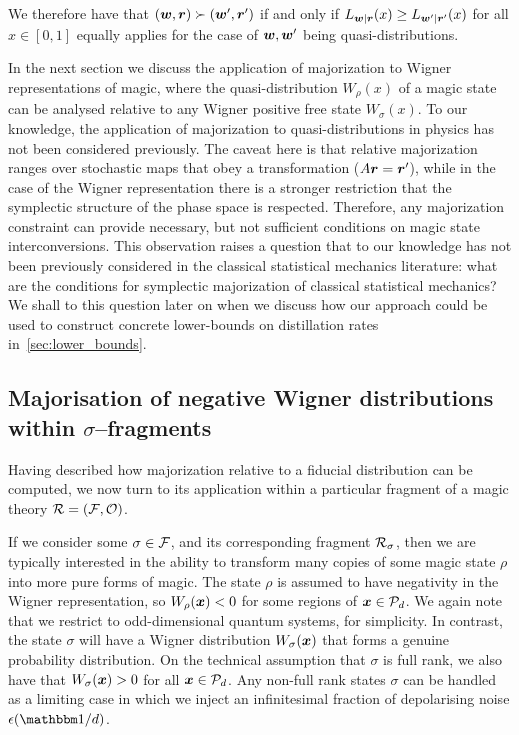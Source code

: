 \documentclass[pra,
aps,
twocolumn,
superscriptaddress,
groupedaddress,
nofootinbib,
reprint
]{revtex4-1}
\begin{document}
We therefore have that $(\boldsymbol{w}, \boldsymbol{r}) \succ (\boldsymbol{w}', \boldsymbol{r}')$ if and only if $L_{\boldsymbol{w} | \boldsymbol{r}} (x) \ge L_{\boldsymbol{w}' | \boldsymbol{r}'}(x)$ for all $x \in [0,1]$ equally applies for the case of $\boldsymbol{w},\boldsymbol{w}'$ being quasi-distributions. 

In the next section we discuss the application of majorization to Wigner representations of magic, where the quasi-distribution $W_\rho(x)$ of a magic state can be analysed relative to any Wigner positive free state $W_\sigma(x)$. To our knowledge, the application of majorization to quasi-distributions in  physics has not been considered previously. The caveat here is that relative majorization ranges over stochastic maps that obey a transformation ($A\boldsymbol{r} = \boldsymbol{r}'$), while in the case of the Wigner representation there is a stronger restriction that the symplectic structure of the phase space is respected. Therefore, any majorization constraint can provide necessary, but not sufficient conditions on magic state interconversions. This observation raises a question that to our knowledge has not been previously considered in the classical statistical mechanics literature: what are the conditions for symplectic majorization of classical statistical mechanics? We shall  to this question later on when we discuss how our approach could be used to construct concrete lower-bounds on distillation rates in~\cref{sec:lower_bounds}.

\subsection{Majorisation of negative Wigner distributions within $\sigma$--fragments}
\label{sec:major_frag}

Having described how majorization relative to a fiducial distribution can be computed, we now turn to its application within a particular fragment of a magic theory $\mathcal{R}= (\mathcal{F}, \mathcal{O})$.

If we consider some $\sigma \in \mathcal{F}$, and its corresponding fragment $\mathcal{R}_\sigma$, then we are typically interested in the ability to transform many copies of some magic state $\rho$ into more pure forms of magic. The state $\rho$ is assumed to have negativity in the Wigner representation, so $W_\rho(\boldsymbol{x}) < 0$ for some regions of $\boldsymbol{x} \in {\mathcal P}_d$. We again note that we restrict to odd-dimensional quantum systems, for simplicity. In contrast, the state $\sigma$ will have a Wigner distribution $W_\sigma(\boldsymbol{x})$ that forms a genuine probability distribution. On the technical assumption that $\sigma$ is full rank, we also have that $W_\sigma(\boldsymbol{x}) > 0$ for all $\boldsymbol{x} \in {\mathcal P}_d$. Any non-full rank states $\sigma$ can be handled as a limiting case in which we inject an infinitesimal fraction of depolarising noise $\epsilon (\id/d)$.
\end{document}
